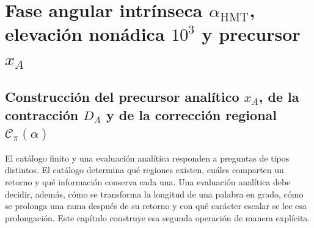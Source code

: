 
\label{chap:p3-83-30-angulo_contraangulo}

\label{p3-20260826:chap:realizacion-analitica-contraangulo}

\section{Fase angular intrínseca \texorpdfstring{\(\alpha_{\mathrm{HMT}}\)}{alpha HMT}, elevación nonádica \texorpdfstring{\(10^3\)}{10^3} y precursor \texorpdfstring{\(x_A\)}{x_A}}
\label{sec:s102:c38:1}

\subsection{Construcción del precursor analítico \texorpdfstring{\(x_A\)}{x_A}, de la contracción \texorpdfstring{\(D_A\)}{D_A} y de la corrección regional \texorpdfstring{\(\mathscr C_\pi(\alpha)\)}{C_pi(alpha)}}
\label{sec:s102:c38:1:1}

\label{p3-83-c30-s1:chap:realizacion-analitica-contraangulo}

El catálogo finito y una evaluación analítica responden a preguntas de tipos
distintos. El catálogo determina qué regiones existen, cuáles comparten un
retorno y qué información conserva cada una. Una evaluación analítica debe
decidir, además, cómo se transforma la longitud de una palabra en grado, cómo
se prolonga una rama después de su retorno y con qué carácter escalar se lee
esa prolongación. Este capítulo construye esa segunda operación de manera
explícita.

